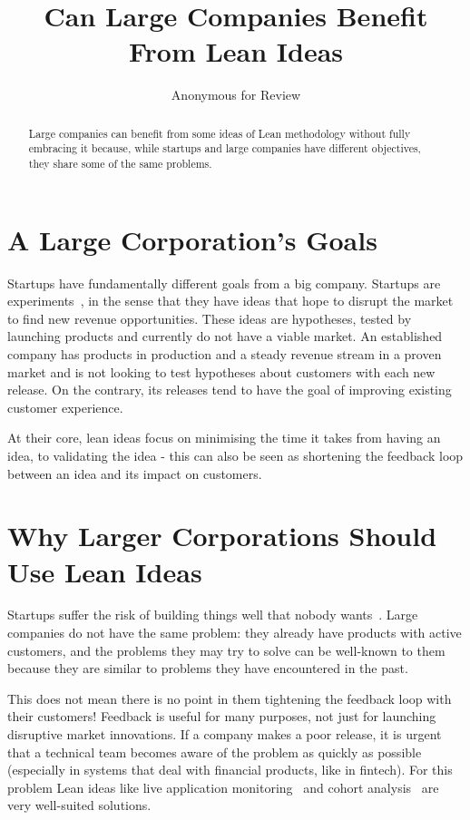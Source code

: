 \documentclass[conference]{IEEEtran}
\title{Can Large Companies Benefit From Lean Ideas}
\begin{document}
    \author{Anonymous for Review}

    \maketitle

    \begin{abstract}
        Large companies can benefit from some ideas of Lean methodology without fully embracing it because, while startups and large companies have different objectives, they share some of the same problems.
    \end{abstract}


    \section{A Large Corporation's Goals}
    \label{section:intro}
    Startups have fundamentally different goals from a big company.
    Startups are experiments~\cite{theLeanStartup}, in the sense that they have ideas that hope to disrupt the market to find new revenue opportunities.
    These ideas are hypotheses, tested by launching products and currently do not have a viable market.
    An established company has products in production and a steady
    revenue stream in a proven market and is not looking to test hypotheses about customers with each new release.
    On the contrary, its releases tend to have the goal of improving existing customer experience.

    At their core, lean ideas focus on minimising the time it takes from having an idea, to validating the idea - this can also be seen as shortening the feedback loop between an idea and its impact on customers.

    \section{Why Larger Corporations Should Use Lean Ideas}
    Startups suffer the risk of building things well that nobody wants~\cite{theLeanStartup}.
    Large companies do not have the same problem: they already have products with active customers, and
    the problems they may try to solve can be well-known to them because they are similar to problems
    they have encountered in the past.

    This does not mean there is no point in them tightening the feedback
    loop with their customers! Feedback is useful for many purposes, not just for launching disruptive market innovations.
    If a company makes a poor release, it is urgent that a technical team becomes aware of the problem as quickly as possible
    (especially in systems that deal with financial products, like in fintech).
    For this problem Lean ideas like live application monitoring~\cite{dragichApm} and cohort analysis~\cite{theLeanStartupBlog} are very well-suited solutions.
\end{document}

